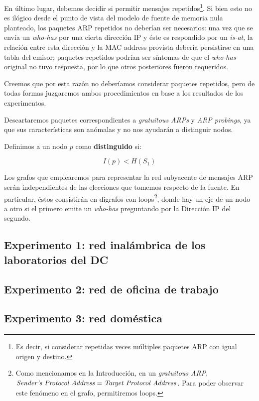 \par En último lugar, debemos decidir si permitir mensajes repetidos\footnote{Es decir, si considerar repetidas veces múltiples paquetes ARP con igual origen y destino.}. 
Si bien esto no es ilógico desde el punto de vista del modelo de fuente de memoria nula planteado, los paquetes ARP repetidos no deberían ser necesarios: una vez que se envía un \textit{who-has} por una cierta dirección IP y éste es respondido por un \textit{is-at}, la relación entre esta dirección y la MAC address provista debería persistirse en una tabla del emisor; paquetes repetidos podrían ser síntomas de que el \textit{who-has} original no tuvo respuesta, por lo que otros posteriores fueron requeridos.

\par Creemos que por esta razón no deberíamos considerar paquetes repetidos, pero de todas formas juzgaremos ambos procedimientos en base a los resultados de los experimentos.

\par Descartaremos paquetes correspondientes a \textit{gratuitous ARPs} y \textit{ARP probings}, ya que sus características son anómalas y no nos ayudarán a distinguir nodos.

\par Definimos a un nodo $p$ como \textbf{distinguido} si:

\begin{equation*}
    I(p) < H(S_1)
\end{equation*}

\par Los grafos que emplearemos para representar la red subyacente de mensajes ARP serán independientes de las elecciones que tomemos respecto de la fuente.
En particular, éstos consistirán en digrafos con loops\footnote{Como mencionamos en la Introducción, en un \textit{gratuitous ARP}, $\text{\textit{Sender's Protocol Address}} = \text{\textit{Target Protocol Address}}$. Para poder observar este fenómeno en el grafo, permitiremos loops.}, donde hay un eje de un nodo a otro si el primero emite un \textit{who-has} preguntando por la Dirección IP del segundo.
 
\subsection{Experimento 1: red inalámbrica de los laboratorios del DC}

\subsection{Experimento 2: red de oficina de trabajo}

\subsection{Experimento 3: red doméstica}

